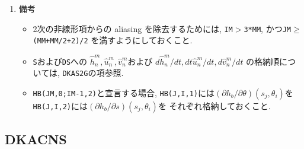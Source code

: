 \documentclass[a4j,fleqn]{jarticle}
\begin{document}
\begin{enumerate}
\item 備考

\begin{itemize}

\item 2次の非線形項からの aliasing を除去するためには,
 {\tt IM}$>${\tt 3*MM}, かつ{\tt JM}$\ge${\tt (MM+MM/2+2)/2}
 を満すようにしておくこと.

\item {\tt S}および{\tt DS}への
$\hat h^m_n,\hat u^m_n,\hat v^m_n$および
$d\hat h^m_n/dt,dt\hat u^m_n/dt,d\hat v^m_n/dt$
の格納順については, {\tt DKAS2G}の項参照.

\item {\tt HB(JM,0;IM-1,2)}と宣言する場合,
   {\tt HB(J,I,1)}には$(\partial h_b/\partial\theta)(s_j,\theta_i)$を
   {\tt HB(J,I,2)}には$(\partial h_b/\partial s)(s_j,\theta_i)$を
   それぞれ格納しておくこと.
\end{itemize}

\end{enumerate}


\subsection{DKACNS}
\end{document}
